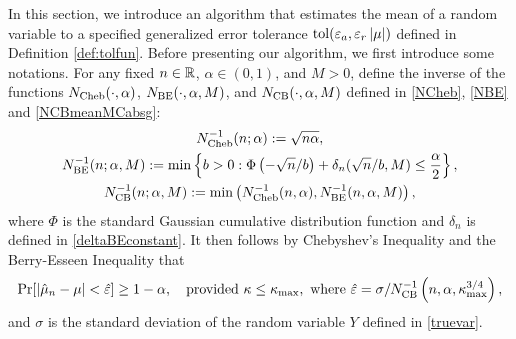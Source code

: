 \documentclass{iitthesis}
\theoremstyle{definition}
\begin{document}
In this section, we introduce an algorithm that estimates the mean of a random variable to a specified generalized error tolerance $\operatorname{tol}(\varepsilon_a, \varepsilon_r\left \lvert \mu \right \rvert)$ defined in Definition \ref{def:tolfun}. Before presenting our algorithm, we first introduce some notations. 
For any fixed $n \in \mathbb{R}$, $\alpha \in (0,1)$, and $M>0$, define the inverse of the functions $N_{\operatorname{Cheb}}(\cdot,\alpha)$, $N_{\operatorname{BE}}(\cdot,\alpha,M)$, and $N_{\operatorname{CB}}(\cdot,\alpha,M)$ defined in \eqref{NCheb}, \eqref{NBE} and \eqref{NCBmeanMCabsg}:
\begin{gather}\label{NCinv*}
N_{\operatorname{Cheb}}^{-1}(n;\alpha) := \sqrt{n \alpha}, \\
\label{NBinv*}
N_{\operatorname{BE}}^{-1}(n;\alpha,M) := \min \left \{ b>0 : \Phi\left(-\sqrt{n}/b  \right)+\delta_n(\sqrt{n}/b,M)
\le \frac{\alpha}{2} \right \}, \\
\label{NCBinv}
N_{\operatorname{CB}}^{-1}(n;\alpha,M) := \min\left(N_{\operatorname{Cheb}}^{-1}(n,\alpha),N_{\operatorname{BE}}^{-1}(n,\alpha,M)\right),
\end{gather}
where $\Phi$ is the standard Gaussian cumulative distribution function and $\delta_n$ is defined in \eqref{deltaBEconstant}. It then follows by Chebyshev's Inequality and the Berry-Esseen Inequality that 
\begin{equation*}
\Pr[\left \lvert \hat{\mu}_n -\mu \right \rvert<\hat{\varepsilon}] \geq 1-\alpha, \quad \text{provided } \kappa\leq\kappa_{\max}, \text{ where }\hat{\varepsilon}=\sigma/N_{\operatorname{CB}}^{-1}\left(n,\alpha,\kappa_{\max}^{3/4}\right), 
\end{equation*} 
and $\sigma$ is the standard deviation of the random variable $Y$ defined in \eqref{truevar}.  
\end{document}
